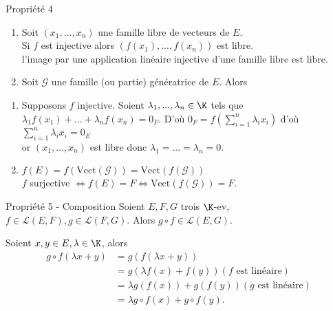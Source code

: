 \documentclass[12pt, a4paper]{report}
\begin{document}
\begin{remarque}{}
\begin{proposition}{Propriété 4}{}
\begin{enumerate}
	\item Soit $(x_1,...,x_n)$ une famille libre de vecteurs de $E$. \\
	Si $f$ est injective alors $(f(x_1),...,f(x_n))$ est libre. \\
	\ie l'image par une application linéaire injective d'une famille libre est libre.
	
	\item Soit $\mathcal{G}$ une famille (ou partie) génératrice de $E$. Alors \\
	\begin{center}
	\end{center}
\end{enumerate}
\end{proposition}

\begin{demo}{}
\begin{enumerate}
	\item Supposons $f$ injective. Soient $\lambda_1,...,\lambda_n \in \K$ tels que $\lambda_1f(x_1)+...+\lambda_nf(x_n) = 0_F$.
	D'où $0_F = f\left(\displaystyle{\sum_{i=1}^n \lambda_i x_i}\right)$ d'où $\displaystyle{\sum_{i=1}^n \lambda_ix_i} = 0_E$ \\
	or $(x_1,...,x_n)$ est libre donc $\lambda_1=...=\lambda_n = 0$.
	\item $f(E) = f(\text{Vect}(\mathcal{G})) = \text{Vect}(f(\mathcal{G}))$ \\
	$f$ surjective $\Longleftrightarrow f(E) = F \Longleftrightarrow \text{Vect}(f(\mathcal{G})) = F$.
\end{enumerate}
\end{demo}

\begin{proposition}{Propriété 5 - Composition}{}
Soient $E,F,G$ trois $\K$-ev, $f \in \mathcal{L}(E,F), g \in \mathcal{L}(F,G)$. Alors $g\circ f \in \mathcal{L}(E,G)$.
\end{proposition}

\begin{demo}{}
Soient $x,y \in E, \lambda \in \K$, alors
\begin{align*}
g \circ f(\lambda x + y) &= g(f(\lambda x + y)) \\
&= g(\lambda f(x) + f(y)) (f \text{ est linéaire}) \\
&= \lambda g(f(x))+g(f(y)) (g \text{ est linéaire}) \\
&= \lambda g \circ f (x) + g \circ f(y).
\end{align*}
\end{demo}


\end{remarque}
\end{document}
